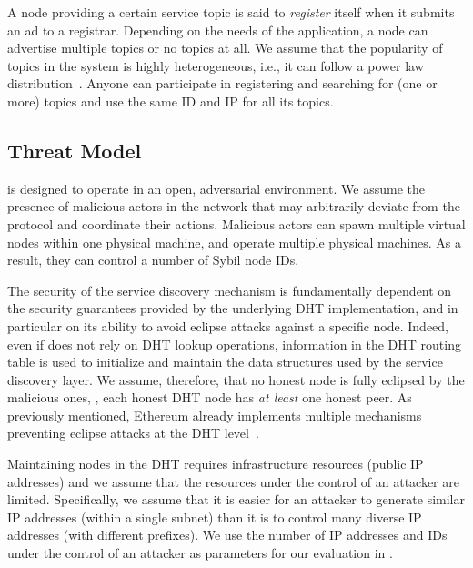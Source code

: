 A node providing a certain service topic is said to \emph{register} itself when it submits an ad to a registrar. %
Depending on the needs of the application, a node can advertise multiple topics or no topics at all. 
We assume that the popularity of topics in the system is highly heterogeneous, i.e., it can follow a power law distribution~\cite{kim2018measuring}.
Anyone can participate in registering and searching for (one or more) topics and use the same ID and IP for all its topics. 

\subsection{Threat Model}
\label{sec:threat}

\sysname is designed to operate in an open, adversarial environment.
We assume the presence of malicious actors in the network that may arbitrarily deviate from the protocol and coordinate their actions.
Malicious actors can spawn multiple virtual nodes within one physical machine, and operate multiple physical machines.
As a result, they can control a number of Sybil node IDs.


The security of the service discovery mechanism is fundamentally dependent on the security guarantees provided by the underlying DHT implementation, and in particular on its ability to avoid eclipse attacks against a specific node.
Indeed, even if \sysname does not rely on DHT lookup operations, information in the DHT routing table is used to initialize and maintain the data structures used by the service discovery layer.
We assume, therefore, that no honest node is fully eclipsed by the malicious ones, \ie, each honest DHT node has \emph{at least} one honest peer.
As previously mentioned, Ethereum already implements multiple mechanisms preventing eclipse attacks at the DHT level~\cite{marcus2018low, henningsen2019eclipsing}.  

Maintaining nodes in the DHT requires infrastructure resources (public IP addresses) and we assume that the resources under the control of an attacker are limited.
Specifically, we assume that it is easier for an attacker to generate similar IP addresses (\ie within a single subnet) than it is to control many diverse IP addresses (with different prefixes).
We use the number of IP addresses and IDs under the control of an attacker as parameters for our evaluation in .


